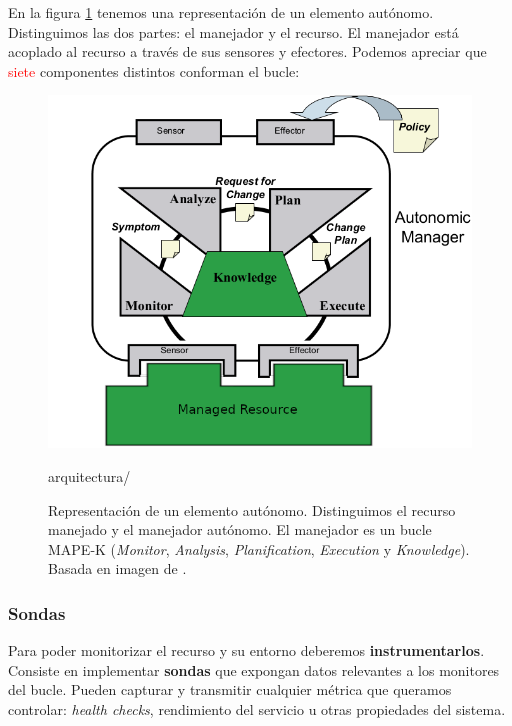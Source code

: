 En la figura \ref{fig:autonomic-element} tenemos una representación de un elemento autónomo. Distinguimos las dos partes: el manejador y el recurso. El manejador está acoplado al recurso a través de sus sensores y efectores. Podemos apreciar que \textcolor{red}{siete} componentes distintos conforman el bucle: \cite{ibmcorporationArchitecturalBlueprintAutonomic2006}

\begin{figure}[h]
  \centering
  \includegraphics[scale=2]{cap_contexto_tecnologico/images/autonomic-element}
  \caption[Representación de un elemento autónomo. Distinguimos el recurso manejado y el manejador autónomo. El manejador es un bucle MAPE-K (\emph{Monitor}, \emph{Analysis}, \emph{Planification}, \emph{Execution} y \emph{Knowledge})]{Representación de un elemento autónomo. Distinguimos el recurso manejado y el manejador autónomo. El manejador es un bucle MAPE-K (\emph{Monitor}, \emph{Analysis}, \emph{Planification}, \emph{Execution} y \emph{Knowledge}). Basada en imagen de \cite{ibmcorporationArchitecturalBlueprintAutonomic2006}.}
  \label{fig:autonomic-element}arquitectura/
\end{figure}

\subsubsection{Sondas}
Para poder monitorizar el recurso y su entorno deberemos \textbf{instrumentarlos}. Consiste en implementar \textbf{sondas} que expongan datos relevantes a los monitores del bucle. Pueden capturar y transmitir cualquier métrica que queramos controlar: \emph{health checks}, rendimiento del servicio u otras propiedades del sistema.

